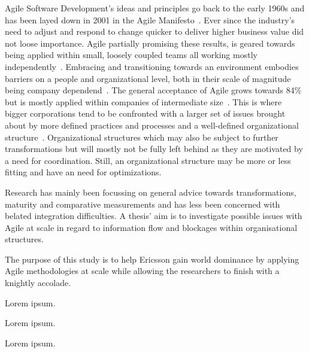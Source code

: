 \documentclass[times, 10pt,twocolumn]{article}
\begin{document}

	Agile Software Development’s ideas and principles go back to the early 1960s and has been layed down in 2001 in the Agile Manifesto~\cite{beck2001agile}. Ever since the industry’s need to adjust and respond to change quicker to deliver higher business value did not loose importance. Agile partially promising these results, is geared towards being applied within small, loosely coupled teams all working mostly independently~\cite{stober2009agile}. Embracing and transitioning towards an environment embodies barriers on a people and organizational level, both in their scale of magnitude being company dependend~\cite{schiel2009enterprise}. The general acceptance of Agile grows towards 84\% but is mostly applied within companies of intermediate size~\cite{7thagilesur}. This is where bigger corporations tend to be confronted with a larger set of issues brought about by more defined practices and processes and a well-defined organizational structure~\cite{schiel2009enterprise}. Organizational structures which may also be subject to further transformations but will mostly not be fully left behind as they are motivated by a need for coordination. Still, an organizational structure may be more or less fitting and have an need for optimizations.

	Research has mainly been focussing on general advice towards transformations, maturity and comparative measurements and has less been concerned with belated integration difficulties. A thesis’ aim is to investigate possible issues with Agile at scale in regard to information flow and blockages within organisational structures.


	\begin{comment}
	  - Is this to be company specific, only research fueled or a combination of the two?
	  - Having slight problems wrapping my head around disentangling problem and literature review...
	\end{comment}


	The purpose of this study is to help Ericsson gain world dominance by applying Agile methodologies at scale while allowing the researchers to finish with a knightly accolade.


	\begin{comment}
	  - Seperate ourselves from
	  		- Traditional metrics: cost, value etc
	  		- Traditional maturity models: focussing on application of methogologies mainly
	  - Move towards a disregard to Agile with organizational structures in literature
	  		- Integration, information flow etc... link back to purpose
	  - Mention Agile at Scale to emphasize issues
	\end{comment}


	Lorem ipsum.


	Lorem ipsum.


	Lorem ipsum.

	
	
\end{document}
